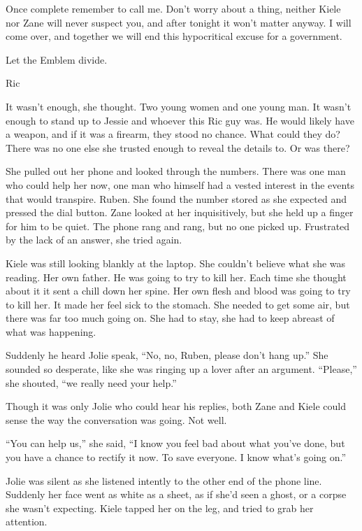 Once complete remember to call me.  Don't worry about a thing, neither Kiele nor Zane will never suspect you, and after tonight it won't matter anyway.  I will come over, and together we will end this hypocritical excuse for a government.  

Let the Emblem divide.  



Ric



It wasn't enough, she thought.  Two young women and one young man.  It wasn't enough to stand up to Jessie and whoever this Ric guy was.  He would likely have a weapon, and if it was a firearm, they stood no chance.  What could they do?  There was no one else she trusted enough to reveal the details to.  Or was there?

She pulled out her phone and looked through the numbers.  There was one man who could help her now, one man who himself had a vested interest in the events that would transpire.  Ruben.  She found the number stored as she expected and pressed the dial button.  Zane looked at her inquisitively, but she held up a finger for him to be quiet.  The phone rang and rang, but no one picked up.  Frustrated by the lack of an answer, she tried again.  

Kiele was still looking blankly at the laptop.  She couldn't believe what she was reading.  Her own father.  He was going to try to kill her.  Each time she thought about it it sent a chill down her spine.  Her own flesh and blood was going to try to kill her.  It made her feel sick to the stomach.  She needed to get some air, but there was far too much going on.  She had to stay, she had to keep abreast of what was happening.  

Suddenly he heard Jolie speak, ``No, no, Ruben, please don't hang up.''  She sounded so desperate, like she was ringing up a lover after an argument.  ``Please,'' she shouted, ``we really need your help.''

Though it was only Jolie who could hear his replies, both Zane and Kiele could sense the way the conversation was going.  Not well.

``You can help us,'' she said, ``I know you feel bad about what you've done, but you have a chance to rectify it now.  To save everyone.  I know what's going on.''

Jolie was silent as she listened intently to the other end of the phone line.  Suddenly her face went as white as a sheet, as if she'd seen a ghost, or a corpse she wasn't expecting.  Kiele tapped her on the leg, and tried to grab her attention.

